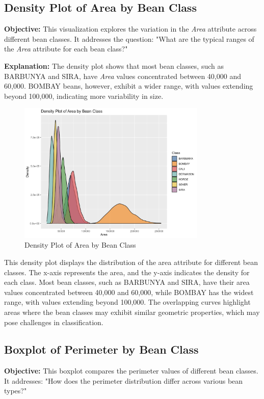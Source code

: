 \documentclass[a4paper,12pt]{article}
\begin{document}
\newpage

\subsection{Density Plot of Area by Bean Class}
\noindent\textbf{Objective:} This visualization explores the variation in the \textit{Area} attribute across different bean classes. It addresses the question: "What are the typical ranges of the \textit{Area} attribute for each bean class?"

\noindent\textbf{Explanation:} The density plot shows that most bean classes, such as BARBUNYA and SIRA, have \textit{Area} values concentrated between 40,000 and 60,000. BOMBAY beans, however, exhibit a wider range, with values extending beyond 100,000, indicating more variability in size.

\begin{figure}[H]
    \centering
    \includegraphics[width=0.8\textwidth]{graphs/density_area_by_class.png}
    \caption{Density Plot of Area by Bean Class}
    \label{fig:density_area}
\end{figure}
This density plot displays the distribution of the area attribute for different bean classes. The x-axis represents the area, and the y-axis indicates the density for each class. Most bean classes, such as BARBUNYA and SIRA, have their area values concentrated between 40,000 and 60,000, while BOMBAY has the widest range, with values extending beyond 100,000. The overlapping curves highlight areas where the bean classes may exhibit similar geometric properties, which may pose challenges in classification.

\newpage

\subsection{Boxplot of Perimeter by Bean Class}
\noindent\textbf{Objective:} This boxplot compares the perimeter values of different bean classes. It addresses: "How does the perimeter distribution differ across various bean types?"
\end{document}
